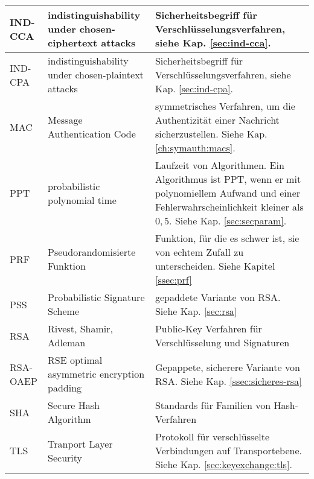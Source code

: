 \begin{tabular}{p{} | p{} | p{}}
  IND-CCA     & indistinguishability under chosen-ciphertext attacks       & Sicherheitsbegriff für Verschlüsselungsverfahren, siehe Kap. \ref{sec:ind-cca}. \\ \hline
  IND-CPA     & indistinguishability under chosen-plaintext attacks        & Sicherheitsbegriff für Verschlüsselungsverfahren, siehe Kap. \ref{sec:ind-cpa}. \\ \hline
  MAC         & Message Authentication Code                                & symmetrisches Verfahren, um die Authentizität einer Nachricht                                   
                                           sicherzustellen. Siehe Kap. \ref{ch:symauth:macs}.               \\ \hline
  PPT         & probabilistic polynomial time                              & Laufzeit von Algorithmen. Ein Algorithmus ist PPT, wenn er mit polynomiellem Aufwand und        
                                                                      einer  Fehlerwahrscheinlichkeit kleiner als $0,5$. Siehe Kap. \ref{sec:secparam}. \\ \hline 
  PRF         & Pseudorandomisierte Funktion                               & Funktion, für die es schwer ist, sie von echtem Zufall zu                                       
                                       unterscheiden. Siehe Kapitel \ref{ssec:prf}                      \\ \hline
  PSS         & Probabilistic Signature Scheme                             & gepaddete Variante von RSA. Siehe Kap. \ref{sec:rsa}             \\ \hline
  RSA         & Rivest, Shamir, Adleman                                    & Public-Key Verfahren für Verschlüsselung und Signaturen          \\ \hline
  RSA-OAEP    & RSE optimal asymmetric encryption padding                  & Gepappete, sicherere Variante von RSA. Siehe Kap. \ref{ssec:sicheres-rsa}  \\ \hline
  SHA         & Secure Hash Algorithm                                      & Standards für Familien von Hash-Verfahren                        \\ \hline
  TLS         & Tranport Layer Security                                    & Protokoll für verschlüsselte Verbindungen auf Transportebene.                                   
                                                                             Siehe Kap. \ref{sec:keyexchange:tls}.                            \\ \hline
\end{tabular}
